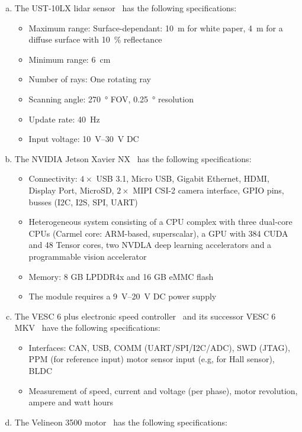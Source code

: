 \documentclass[letta4 paper]{article}
\numberwithin{equation}{section}
\newcommand{\0}{\mathbf{0}}
\begin{document}
	\begin{enumerate}[a.) ]
      \item The UST-10LX lidar sensor~\cite{lidar} has the following specifications: \begin{itemize}
         \item Maximum range: Surface-dependant: \SI{10}{m} for white paper,  \SI{4}{m} for a diffuse surface with \SI{10}{\percent} reflectance
         \item Minimum range: \SI{6}{cm}
         \item Number of rays: One rotating ray
         \item Scanning angle: \SI{270}{\degree} FOV, \SI{0.25}{\degree} resolution
         \item Update rate: \SI{40}{Hz}
         \item Input voltage: \SIrange{10}{30}{V} DC
      \end{itemize}
      \item The NVIDIA Jetson Xavier NX~\cite{jetson} has the following specifications: \begin{itemize}
         \item Connectivity: $4\times$ USB 3.1, Micro USB, Gigabit Ethernet, HDMI, Display Port, MicroSD, $2\times$ MIPI CSI-2 camera interface, GPIO pins, busses (I2C, I2S, SPI, UART)
         \item Heterogeneous system consisting of a CPU complex with three dual-core CPUs (Carmel core: ARM-based, superscalar), a GPU with 384 CUDA and 48 Tensor cores, two NVDLA deep learning accelerators and a programmable vision accelerator
         \item Memory: 8 GB LPDDR4x and 16 GB eMMC flash
         \item The module requires a \SIrange{9}{20}{V} DC power supply
      \end{itemize}
      \item The VESC 6 plus electronic speed controller~\cite{esc-schematics} and its successor VESC 6 MKV~\cite{esc-mkv} have the following specifications: \begin{itemize}
         \item Interfaces:  CAN, USB, COMM (UART/SPI/I2C/ADC), SWD (JTAG), PPM (for reference input) motor sensor input (e.g, for Hall sensor), BLDC
         \item Measurement of speed, current and voltage (per phase), motor revolution, ampere and watt hours
      \end{itemize}
      \item The Velineon 3500 motor~\cite{motor} has the following specifications: \begin{itemize}

\end{itemize}
\end{enumerate}
\end{document}
